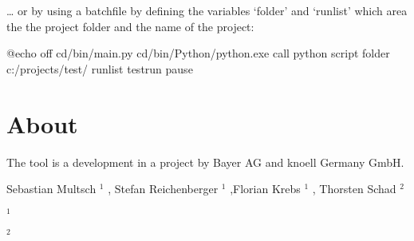 \documentclass[letterpaper,10pt,english]{sphinxmanual}
\begin{document}
\begin{sphinxVerbatim}[commandchars=\\\{\},numbers=left,firstnumber=1,stepnumber=1]
    


\end{sphinxVerbatim}

… or by using a batchfile by defining the variables ‘\textendash{}folder’ and ‘\textendash{}runlist’ which
area the the project folder and the name of the project:

%
\begin{sphinxVerbatim}[commandchars=\\\{\},numbers=left,firstnumber=1,stepnumber=1]
@echo off
 \PYGZpc{}cd\PYGZpc{}/bin/main.py
 \PYGZpc{}cd\PYGZpc{}/bin/Python/python.exe
call \PYGZpc{}python\PYGZpc{} \PYGZpc{}script\PYGZpc{} \PYGZhy{}\PYGZhy{}folder c:/projects/test/ \PYGZhy{}\PYGZhy{}runlist testrun
pause
\end{sphinxVerbatim}


\chapter{About}
\label{\detokenize{index:about}}
The tool is a development in a project by Bayer AG and knoell Germany GmbH.

Sebastian Multsch $^{\text{1}}$ , Stefan Reichenberger $^{\text{1}}$ ,Florian Krebs $^{\text{1}}$ , Thorsten Schad $^{\text{2}}$

$^{\text{1}}$ 

$^{\text{2}}$ 



\renewcommand{\indexname}{Index}
\printindex
\end{document}
